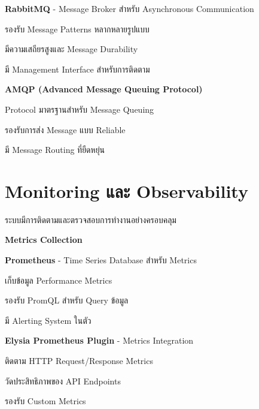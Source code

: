 \begin{mycustomenum2}
    \item \textbf{RabbitMQ} - Message Broker สำหรับ Asynchronous Communication
    \begin{mycustomenum2}
        \item รองรับ Message Patterns หลากหลายรูปแบบ
        \item มีความเสถียรสูงและ Message Durability
        \item มี Management Interface สำหรับการติดตาม
    \end{mycustomenum2}

    \item \textbf{AMQP (Advanced Message Queuing Protocol)}
    \begin{mycustomenum2}
        \item Protocol มาตรฐานสำหรับ Message Queuing
        \item รองรับการส่ง Message แบบ Reliable
        \item มี Message Routing ที่ยืดหยุ่น
    \end{mycustomenum2}
\end{mycustomenum2}

\section{Monitoring และ Observability}
\hspace*{1.5em}
ระบบมีการติดตามและตรวจสอบการทำงานอย่างครอบคลุม

\vspace{0.5em}
\textbf{Metrics Collection}
\vspace{0.5em}

\begin{mycustomenum2}
    \item \textbf{Prometheus} - Time Series Database สำหรับ Metrics
    \begin{mycustomenum2}
        \item เก็บข้อมูล Performance Metrics
        \item รองรับ PromQL สำหรับ Query ข้อมูล
        \item มี Alerting System ในตัว
    \end{mycustomenum2}

    \item \textbf{Elysia Prometheus Plugin} - Metrics Integration
    \begin{mycustomenum2}
        \item ติดตาม HTTP Request/Response Metrics
        \item วัดประสิทธิภาพของ API Endpoints
        \item รองรับ Custom Metrics
    \end{mycustomenum2}
\end{mycustomenum2}

